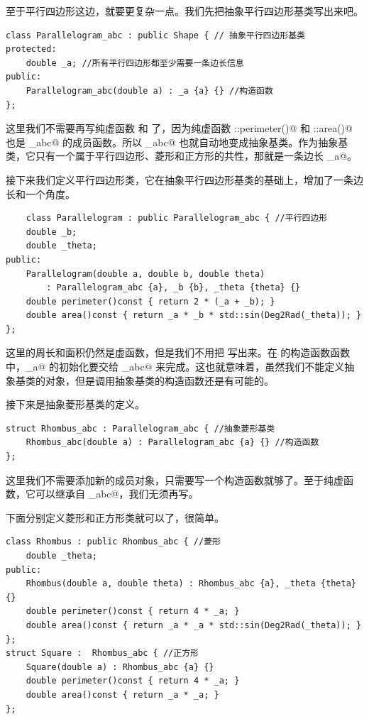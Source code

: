 至于平行四边形这边，就要更复杂一点。我们先把抽象平行四边形基类写出来吧。
\begin{lstlisting}
class Parallelogram_abc : public Shape { // 抽象平行四边形基类
protected:
    double _a; //所有平行四边形都至少需要一条边长信息
public:
    Parallelogram_abc(double a) : _a {a} {} //构造函数
};
\end{lstlisting}
这里我们不需要再写纯虚函数 \lstinline@perimeter@ 和 \lstinline@area@ 了，因为纯虚函数 \lstinline@Shape::perimeter()@ 和 \lstinline@Shape::area()@ 也是 \lstinline@Parallelogram_abc@ 的成员函数。所以 \lstinline@Parallelogram_abc@ 也就自动地变成抽象基类。作为抽象基类，它只有一个属于平行四边形、菱形和正方形的共性，那就是一条边长 \lstinline@_a@。\par
接下来我们定义平行四边形类，它在抽象平行四边形基类的基础上，增加了一条边长和一个角度。
\begin{lstlisting}
    class Parallelogram : public Parallelogram_abc { //平行四边形
    double _b;
    double _theta;
public:
    Parallelogram(double a, double b, double theta)
        : Parallelogram_abc {a}, _b {b}, _theta {theta} {}
    double perimeter()const { return 2 * (_a + _b); }
    double area()const { return _a * _b * std::sin(Deg2Rad(_theta)); }
};
\end{lstlisting}
这里的周长和面积仍然是虚函数，但是我们不用把 \lstinline@virtual@ 写出来。在 \lstinline@Parallelogram@ 的构造函数函数中，\lstinline@_a@ 的初始化要交给 \lstinline@Parallelogram_abc@ 来完成。这也就意味着，虽然我们不能定义抽象基类的对象，但是调用抽象基类的构造函数还是有可能的。\par
接下来是抽象菱形基类的定义。
\begin{lstlisting}
struct Rhombus_abc : Parallelogram_abc { //抽象菱形基类
    Rhombus_abc(double a) : Parallelogram_abc {a} {} //构造函数
};
\end{lstlisting}
这里我们不需要添加新的成员对象，只需要写一个构造函数就够了。至于纯虚函数，它可以继承自 \lstinline@Parallelogram_abc@，我们无须再写。\par
下面分别定义菱形和正方形类就可以了，很简单。
\begin{lstlisting}
class Rhombus : public Rhombus_abc { //菱形
    double _theta;
public:
    Rhombus(double a, double theta) : Rhombus_abc {a}, _theta {theta} {}
    double perimeter()const { return 4 * _a; }
    double area()const { return _a * _a * std::sin(Deg2Rad(_theta)); }
};
struct Square :  Rhombus_abc { //正方形
    Square(double a) : Rhombus_abc {a} {}
    double perimeter()const { return 4 * _a; }
    double area()const { return _a * _a; }
};
\end{lstlisting}
